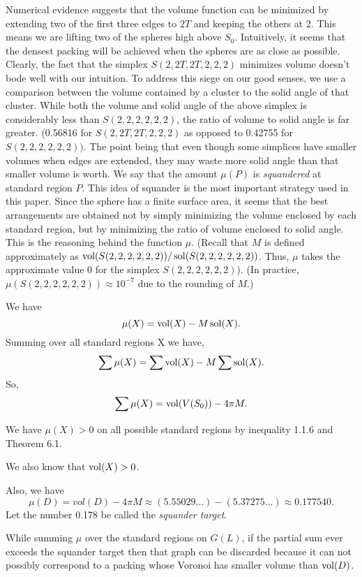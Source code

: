 Numerical evidence suggests that 
the volume function can be minimized by extending two of the first three edges to $2T$ 
and keeping the others at 2.  This means we are lifting two of the spheres high above $S_0$. 
 Intuitively, it seems that the densest packing will be achieved when the spheres are as
 close as possible.  Clearly, the fact that the simplex $S(2,2T,2T,2,2,2)$ minimizes 
volume doesn't bode well with our intuition.  To address this siege on our good senses, we use a 
comparison between the volume contained by a cluster to the solid angle of that cluster.  
While both  the volume and solid angle of the above simplex is considerably less than 
$S(2,2,2,2,2,2)$, the ratio of volume to solid angle is far greater.  
(0.56816 for $S(2,2T,2T,2,2,2)$ as opposed to 0.42755 for $S(2,2,2,2,2,2))$.  
The point being that even though some simplices have smaller volumes when edges are extended, they may 
waste more solid angle than that smaller  volume is worth.  We say that the 
amount $\mu(P)$ is {\it squandered} at standard region $P$.  This idea of squander 
is the most important strategy used in this paper.
Since the sphere has a finite surface area, it seems that the best arrangements are 
obtained not by simply minimizing the volume enclosed by each standard region, 
but by minimizing the ratio of volume enclosed to solid angle.  This is the reasoning 
behind the function $\mu$.  (Recall that $M$ is defined approximately as 
$\operatorname{vol}(S(2,2,2,2,2,2))/\operatorname{sol}(S(2,2,2,2,2,2))$.  Thus, $\mu$ takes the approximate value $0$ for
 the simplex $S(2,2,2,2,2,2)$).  (In practice, $\mu(S(2,2,2,2,2,2))\approx 
10^{-7}$ due to the 
rounding of $M$.)  


We have $$\mu(X)=\operatorname{vol}(X)-M \operatorname{sol}(X).$$
Summing over all standard regions X we have,
$$\sum \mu(X)=\sum \operatorname{vol}(X)-M \sum \operatorname{sol}(X).$$
So,
$$\sum \mu(X)=\operatorname{vol}(V(S_0))-4 \pi M.$$

We have $\mu(X)>0$ on all possible standard regions 
by inequality 1.1.6 and Theorem 6.1.  

We also know that $\operatorname{vol}(X)>0$.

Also, we have $$\mu(D)=vol(D)-4 \pi M \approx (5.55029\dots) -( 5.37275\dots) \approx 0.177540.$$  
Let the number 0.178 be called the {\it squander target}.  

While summing $\mu$ over the standard regions on $G(L)$, if the partial sum ever
 exceeds the squander target then that graph can be discarded because it can not 
possibly correspond to a packing whose Voronoi has smaller volume than $\operatorname{vol}(D)$.

